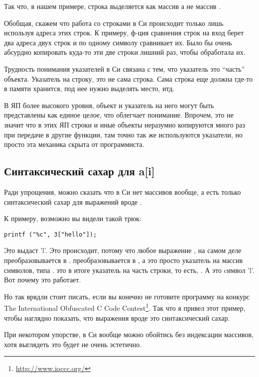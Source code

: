 Так что, в нашем примере, строка выделяется как массив  а не массив .

Обобщая, скажем что работа со строками в Си происходит только лишь используя адреса этих строк. К примеру,
ф-ция сравнения строк  на вход берет два адреса двух строк и по одному символу сравнивает их.
Было бы очень абсурдно копировать куда-то эти две строки лишний раз, чтобы  обработала их.

Трудность понимания указателей в Си связана с тем, что указатель это ``часть'' объекта. Указатель на строку,
это не сама строка. Сама строка еще должна где-то в памяти хранится, под нее нужно выделять место, итд.

В ЯП более высокого уровня, объект и указатель на него могут быть представлены как единое целое, что облегчает
понимание.
Впрочем, это не значит что в этих ЯП строки и иные объекты неразумно копируются много раз при передаче 
в другие функции,
там точно так же используются указатели, но просто эта механика скрыта от программиста.

\subsection{Синтаксический сахар для a[i]}

Ради упрощения, можно сказать что в Си нет массивов вообще, а есть только синтаксический сахар для выражений
вроде .

К примеру, возможно вы видели такой трюк:

\begin{lstlisting}
printf ("%c", 3["hello"]);
\end{lstlisting}

Это выдаст 'l'. Это происходит, потому что любое выражение , на самом деле преобразовывается в .
 преобразовывается в , а  это просто указатель на массив символов, 
типа .
 это в итоге указатель на часть строки, то есть, . А  это cимвол 'l'. 
Вот почему это работает.

Но так врядли стоит писать, если вы конечно не готовите программу на конкурс 
The International Obfuscated C Code Contest\footnote{\url{http://www.ioccc.org/}}.
Так что я привел этот пример, чтобы наглядно показать, что выражения вроде  это синтаксический сахар.

При некотором упорстве, в Си вообще можно обойтись без индексации массивов, хотя выглядеть это будет не очень
эстетично.

